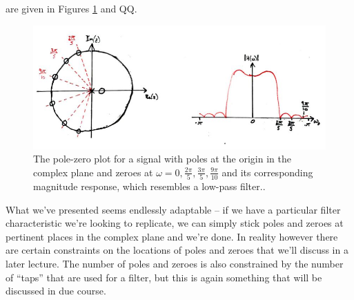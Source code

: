 are given in Figures \ref{fig::lecture_9_poles_zeroes_example_2} and QQ.
%
\begin{figure}[H]
  \includegraphics[width=\textwidth]{images/lecture_9_poles_zeroes_example_2.JPG}
  \caption{
    The pole-zero plot for a signal with poles at the origin in the complex plane
    and zeroes at $\omega = 0, \frac{2\pi}{5}, \frac{3\pi}{5}, \frac{9\pi}{10}$
    and its corresponding magnitude response, which resembles a low-pass filter..
  }
  \label{fig::lecture_9_poles_zeroes_example_2}
\end{figure}
%
What we've presented seems endlessly adaptable -- if we have a particular
filter characteristic we're looking to replicate, we can simply stick poles
and zeroes at pertinent places in the complex plane and we're done. In reality
however there are certain constraints on the locations of poles and zeroes
that we'll discuss in a later lecture. The number of poles and zeroes is also
constrained by the number of ``taps'' that are used for a filter, but this is
again something that will be discussed in due course.
